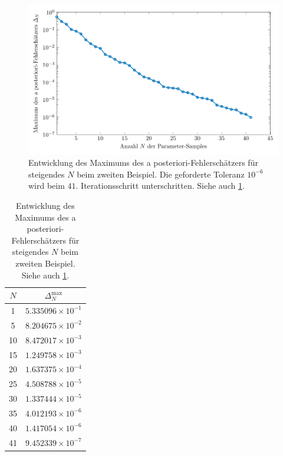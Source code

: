 \documentclass[../main.tex]{subfiles}
\begin{document}
\begin{figure}[tb!]
    \centering
    \includegraphics[width=1\textwidth]{figures/chapter5/ch5ex2_rbm_error.pdf}
    \caption[Entwicklung des Maximums des a posteriori-Fehlerschätzers für steigendes $N$, zweites Beispiel.]{%
        Entwicklung des Maximums des a posteriori-Fehlerschätzers für steigendes $N$ beim zweiten Beispiel.
        Die geforderte Toleranz $10^{-6}$ wird beim $41.$ Iterationsschritt unterschritten.
        Siehe auch \cref{table:entwicklung_rbm_2}.
        }
    \label{figure:entwicklung_rbm_fehler}
\end{figure}

\begin{table}
    \centering
    \begin{tabular}{|c|c|}\hline
      $N$ & $\Delta_{N}^{\mathrm{max}}$ \\ \hline
      1 & $5.335096{\times}10^{-1}$ \\ %
      5 & $8.204675{\times}10^{-2}$ \\ %
     10 & $8.472017{\times}10^{-3}$ \\ %
     15 & $1.249758{\times}10^{-3}$ \\ %
     20 & $1.637375{\times}10^{-4}$ \\ %
     25 & $4.508788{\times}10^{-5}$ \\ %
     30 & $1.337444{\times}10^{-5}$ \\ %
     35 & $4.012193{\times}10^{-6}$ \\ %
     40 & $1.417054{\times}10^{-6}$ \\ %
     41 & $9.452339{\times}10^{-7}$ \\ \hline
    \end{tabular}
    \caption[Entwicklung des Maximums des a posteriori-Fehlerschätzers für einige $N$, zweites Beispiel.]{%
        Entwicklung des Maximums des a posteriori-Fehlerschätzers für steigendes $N$ beim zweiten Beispiel.
        Siehe auch \cref{figure:entwicklung_rbm_fehler}.
    }
    \label{table:entwicklung_rbm_2}
\end{table}
\end{document}
